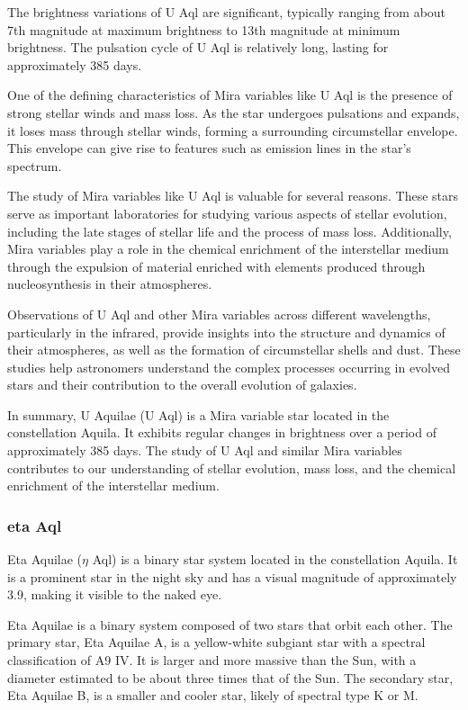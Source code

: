 The brightness variations of U Aql are significant, typically ranging from about 7th magnitude at maximum brightness to 13th magnitude at minimum brightness. The pulsation cycle of U Aql is relatively long, lasting for approximately 385 days.

One of the defining characteristics of Mira variables like U Aql is the presence of strong stellar winds and mass loss. As the star undergoes pulsations and expands, it loses mass through stellar winds, forming a surrounding circumstellar envelope. This envelope can give rise to features such as emission lines in the star's spectrum.

The study of Mira variables like U Aql is valuable for several reasons. These stars serve as important laboratories for studying various aspects of stellar evolution, including the late stages of stellar life and the process of mass loss. Additionally, Mira variables play a role in the chemical enrichment of the interstellar medium through the expulsion of material enriched with elements produced through nucleosynthesis in their atmospheres.

Observations of U Aql and other Mira variables across different wavelengths, particularly in the infrared, provide insights into the structure and dynamics of their atmospheres, as well as the formation of circumstellar shells and dust. These studies help astronomers understand the complex processes occurring in evolved stars and their contribution to the overall evolution of galaxies.

In summary, U Aquilae (U Aql) is a Mira variable star located in the constellation Aquila. It exhibits regular changes in brightness over a period of approximately 385 days. The study of U Aql and similar Mira variables contributes to our understanding of stellar evolution, mass loss, and the chemical enrichment of the interstellar medium.

\subsubsection*{ eta Aql }
Eta Aquilae ($\eta$ Aql) is a binary star system located in the constellation Aquila. It is a prominent star in the night sky and has a visual magnitude of approximately 3.9, making it visible to the naked eye.

Eta Aquilae is a binary system composed of two stars that orbit each other. The primary star, Eta Aquilae A, is a yellow-white subgiant star with a spectral classification of A9 IV. It is larger and more massive than the Sun, with a diameter estimated to be about three times that of the Sun. The secondary star, Eta Aquilae B, is a smaller and cooler star, likely of spectral type K or M.

